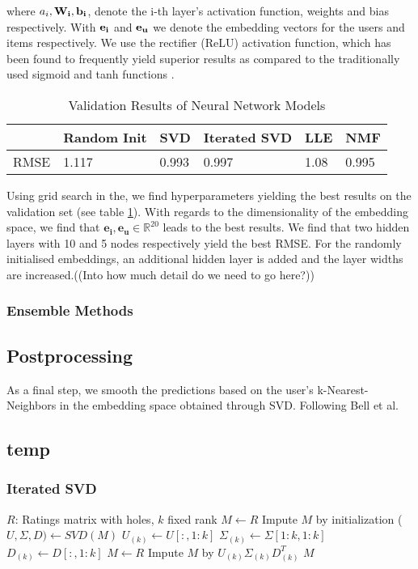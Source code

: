 \documentclass[10pt,conference,compsocconf]{IEEEtran}
\begin{document}
where $a_i,\bf{W_i}, \bf{b_i}$, denote the i-th layer's activation function, weights and bias respectively. With $\bf{e_i}$ and $\bf{e_u}$ we denote the embedding vectors for the users and items respectively. We use the rectifier (ReLU) activation function, which has been found to frequently yield superior results as compared to the traditionally used sigmoid and tanh functions \cite{glorot2011deep}.


\begin{table}[]
\centering
\caption{Validation Results of Neural Network Models}
\label{table:neural_net_models}
\begin{tabular}{|l|l|l|l|l|l|}
\hline
     & Random Init & SVD & Iterated SVD & LLE & NMF \\ \hline
RMSE & 1.117           & 0.993   & 0.997           & 1.08   & 0.995   \\ \hline
\end{tabular}
\end{table}

Using grid search in the, we find hyperparameters yielding the best results on the validation set (see table \ref{table:neural_net_models}). 
With regards to the dimensionality of the embedding space, we find that $\mathbf{e_i}, \mathbf{e_u} \in  \mathbb{R}^{20}$ leads to the best results. We find that two hidden layers with 10 and 5 nodes respectively yield the best RMSE. For the randomly initialised embeddings, an additional hidden layer is added and the layer widths are increased.((Into how much detail do we need to go here?))




\subsubsection{Ensemble Methods}

\subsection{Postprocessing}
As a final step, we smooth the predictions based on the user's  k-Nearest-Neighbors in the embedding space obtained through SVD. Following Bell et al. \cite{bell2007improved}

\subsection{temp}
\subsubsection{Iterated SVD}
\begin{algorithmic}
	\STATE $R$: Ratings matrix with holes, $k$ fixed rank
	\STATE $M \leftarrow R$
	\STATE Impute $M$ by initialization
    	\STATE ($U, \Sigma, D) \leftarrow SVD(M)$
    	\STATE $U_{(k)} \leftarrow U[:, 1:k]$
    	\STATE $\Sigma_{(k)} \leftarrow \Sigma[1:k, 1:k]$
    	\STATE $D_{(k)} \leftarrow D[:, 1:k]$
    	\STATE $M \leftarrow R$
    	\STATE Impute $M$ by $U_{(k)} \Sigma_{(k)} D_{(k)}^T$
    \ENDFOR
    \RETURN $M$
\end{algorithmic}
\end{document}
